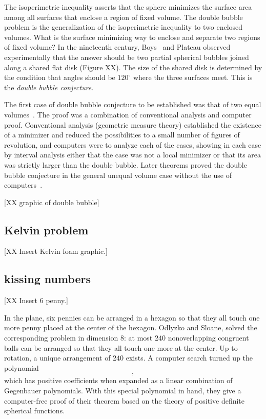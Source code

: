 \documentclass{llncs}
\begin{document}
The isoperimetric inequality asserts that the sphere minimizes the
surface area among all surfaces that enclose a region of fixed volume.
The double bubble problem is the generalization of the isoperimetric
inequality to two enclosed volumes.  What is the surface minimizing way
to enclose and separate two regions of fixed volume?  In the
nineteenth century, Boys~\cite{Boy1890} and Plateau observed
experimentally that the answer should be two partial spherical bubbles
joined along a shared flat disk (Figure XX).  The size of the shared
disk is determined by the condition that angles should be $120^\circ$
where the three surfaces meet.  This is the {\it double bubble
  conjecture}.

The first case of double bubble conjecture to be established was that
of two equal volumes~\cite{HHS95}.  The proof was a combination of conventional
analysis and computer proof.  Conventional analysis (geometric measure
theory) established the existence of a minimizer and reduced the
possibilities to a small number of figures of revolution, and
computers were to analyze each of the cases, showing in each case by
interval analysis either that the case was not a local minimizer or
that its area was strictly larger than the double bubble.  Later
theorems proved the double bubble conjecture in the general unequal
volume case without the use of computers~\cite{HMRR}.

[XX graphic of double bubble]


\subsection{Kelvin problem}

[XX Insert Kelvin foam graphic.]



\subsection{kissing numbers} %

[XX Insert 6 penny.]

In the plane, six pennies can be arranged in a hexagon so that they
all touch one more penny placed at the center of the hexagon.  Odlyzko
and Sloane, solved the corresponding problem in dimension $8$: at most
$240$ nonoverlapping congruent balls can be arranged so that they all
touch one more at the center.  Up to rotation, a unique arrangement of
$240$ exists.  A computer search turned up the polynomial
\[
,
\]
which has positive coefficients when expanded as a linear combination
of Gegenbauer polynomials.  With this special polynomial in hand, they
give a computer-free proof of their theorem based on the theory of
positive definite spherical functions.
\end{document}
